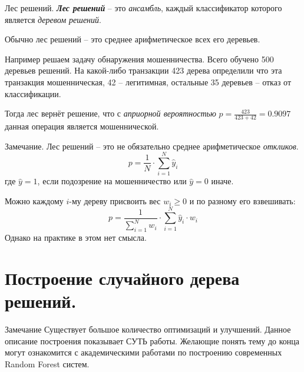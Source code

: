 \documentclass{beamer}
\newcommand{\termdef}[1]{\textbf{\textit{#1}}}
\newcommand{\term}{\textit}
\begin{document}
    \begin{frame}{Лес решений.}
  \termdef{Лес решений} -- это \term{ансамбль}, каждый классификатор которого 
  является \term{деревом решений}.
  
  Обычно лес решений -- это среднее арифметическое всех его деревьев. 
  
  Например решаем задачу обнаружения мошенничества. Всего обучено 500 деревьев решений.
  На какой-либо транзакции 423 дерева определили что эта транзакция мошенническая,
  42 -- легитимная, остальные 35 деревьев -- отказ от классификации.
  
  Тогда лес вернёт решение, что 
  с \term{априорной вероятностью}
  $p=\frac{423}{423+42} = 0.9097$ 
  данная операция является мошеннической.
  \end{frame}

  \begin{frame}
  \begin{block}{Замечание.}
  \small
  Лес решений -- это не обязательно среднее арифметическое \term{откликов}.
  \begin{equation*}
  p = \frac{1}{N} \cdot \sum_{i=1}^{N} \hat y_i
  \end{equation*}
  где $\hat y = 1$, если подозрение на мошенничество или $\hat y =0$ иначе.
  
  Можно каждому $i$-му дереву  присвоить вес $w_i \geqslant 0$ и по разному его взвешивать:
  \begin{equation*}
  p = \frac{1}{ \sum_{i=1}^{N} w_i}  \cdot \sum_{i=1}^{N} \hat y_i \cdot w_i
  \end{equation*}
  Однако на практике в этом нет смысла.
  \end{block}
  \end{frame}

  \section{Построение случайного дерева решений.}\label{section:random_tree_building}

  \begin{frame}
  
  \begin{block}{Замечание}
  	Существует большое количество оптимизаций и улучшений. 
  	Данное описание построения показывает СУТЬ работы. 
  	Желающие понять тему до конца могут ознакомится с академическими работами 
  	по построению современных Random Forest систем.
  \end{block}
  \end{frame}
\end{document}
